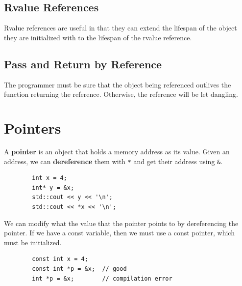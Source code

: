 \documentclass{article}
\newcounter{theorem}[section]
\newcounter{definition}[section]
\begin{document}
  \subsection{Rvalue References}

    Rvalue references are useful in that they can extend the lifespan of the object they are initialized with to the lifespan of the rvalue reference. 

    \begin{definition}
      \label{def:rvalue-reference}
      
    \end{definition}

  \subsection{Pass and Return by Reference}

    \begin{theorem}
      \label{thm:object-must-outlive-function}
      The programmer must be sure that the object being referenced outlives the function returning the reference. Otherwise, the reference will be let dangling. 
    \end{theorem}

\section{Pointers} 

    \begin{definition}[Pointer]
      \label{def:pointer}
      A \textbf{pointer} is an object that holds a memory address as its value. Given an address, we can \textbf{dereference} them with \texttt{*} and get their address using \texttt{\&}. 
      \begin{lstlisting}
        int x = 4; 
        int* y = &x; 
        std::cout << y << '\n'; 
        std::cout << *x << '\n'; 
      \end{lstlisting} 
      We can modify what the value that the pointer points to by dereferencing the pointer. If we have a const variable, then we must use a const pointer, which must be initialized. 
      \begin{lstlisting}
        const int x = 4;  
        const int *p = &x;  // good
        int *p = &x;        // compilation error
      \end{lstlisting}
    \end{definition} 
\end{document}
